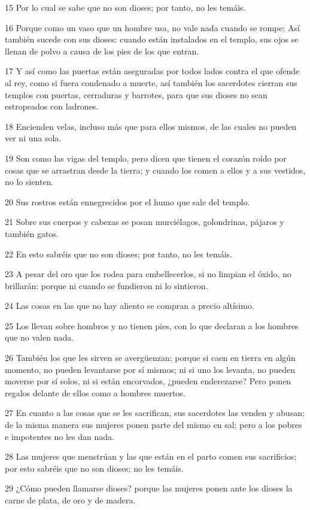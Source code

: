 \par 15 Por lo cual se sabe que no son dioses; por tanto, no les temáis.
\par 16 Porque como un vaso que un hombre usa, no vale nada cuando se rompe; Así también sucede con sus dioses: cuando están instalados en el templo, sus ojos se llenan de polvo a causa de los pies de los que entran.
\par 17 Y así como las puertas están aseguradas por todos lados contra el que ofende al rey, como si fuera condenado a muerte, así también los sacerdotes cierran sus templos con puertas, cerraduras y barrotes, para que sus dioses no sean estropeados con ladrones.
\par 18 Encienden velas, incluso más que para ellos mismos, de las cuales no pueden ver ni una sola.
\par 19 Son como las vigas del templo, pero dicen que tienen el corazón roído por cosas que se arrastran desde la tierra; y cuando los comen a ellos y a sus vestidos, no lo sienten.
\par 20 Sus rostros están ennegrecidos por el humo que sale del templo.
\par 21 Sobre sus cuerpos y cabezas se posan murciélagos, golondrinas, pájaros y también gatos.
\par 22 En esto sabréis que no son dioses; por tanto, no les temáis.
\par 23 A pesar del oro que los rodea para embellecerlos, si no limpian el óxido, no brillarán: porque ni cuando se fundieron ni lo sintieron.
\par 24 Las cosas en las que no hay aliento se compran a precio altísimo.
\par 25 Los llevan sobre hombros y no tienen pies, con lo que declaran a los hombres que no valen nada.
\par 26 También los que les sirven se avergüenzan; porque si caen en tierra en algún momento, no pueden levantarse por sí mismos; ni si uno los levanta, no pueden moverse por sí solos, ni si están encorvados, ¿pueden enderezarse? Pero ponen regalos delante de ellos como a hombres muertos.
\par 27 En cuanto a las cosas que se les sacrifican, sus sacerdotes las venden y abusan; de la misma manera sus mujeres ponen parte del mismo en sal; pero a los pobres e impotentes no les dan nada.
\par 28 Las mujeres que menstrúan y las que están en el parto comen sus sacrificios; por esto sabréis que no son dioses; no les temáis.
\par 29 ¿Cómo pueden llamarse dioses? porque las mujeres ponen ante los dioses la carne de plata, de oro y de madera.
